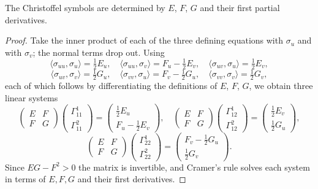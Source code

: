 \begin{lemma}
    The Christoffel symbols are determined by $E$, $F$, $G$ and their first partial derivatives.
\end{lemma}
\begin{proof}
    Take the inner product of each of the three defining equations with $\sigma_u$ and with $\sigma_v$; the normal terms drop out. Using
    $$
    \langle \sigma_{uu}, \sigma_u\rangle = \tfrac12 E_u, \quad \langle\sigma_{uu},\sigma_v\rangle = F_u - \tfrac12 E_v, \quad \langle\sigma_{uv},\sigma_u\rangle = \tfrac12 E_v, $$
    $$\langle \sigma_{uv},\sigma_v\rangle = \tfrac12 G_u, \quad \langle\sigma_{vv},\sigma_u\rangle = F_v - \tfrac12 G_u, \quad \langle\sigma_{vv},\sigma_v\rangle = \tfrac12 G_v,
    $$
    each of which follows by differentiating the definitions of $E$, $F$, $G$, we obtain three linear systems
    $$
    \begin{pmatrix} E & F \\ F & G\end{pmatrix}\begin{pmatrix}\Gamma^1_{11} \\ \Gamma^2_{11}\end{pmatrix} = \begin{pmatrix} \tfrac12 E_u \\ F_u - \tfrac12 E_v\end{pmatrix}, \quad
    \begin{pmatrix} E & F \\ F & G\end{pmatrix}\begin{pmatrix}\Gamma^1_{12} \\ \Gamma^2_{12}\end{pmatrix} = \begin{pmatrix} \tfrac12 E_v \\ \tfrac12 G_u\end{pmatrix},
    $$
    $$
    \begin{pmatrix} E & F \\ F & G\end{pmatrix}\begin{pmatrix}\Gamma^1_{22} \\ \Gamma^2_{22}\end{pmatrix} = \begin{pmatrix} F_v - \tfrac12 G_u \\ \tfrac12 G_v\end{pmatrix}.
    $$
    Since $EG - F^2 > 0$ the matrix is invertible, and Cramer's rule solves each system in terms of $E, F, G$ and their first derivatives.
\end{proof}

